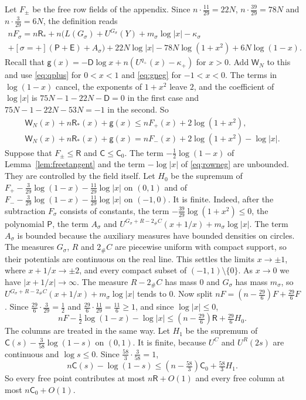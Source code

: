 \documentclass[11pt]{amsart}
\theoremstyle{definition}
\theoremstyle{remark}
\numberwithin{equation}{section}
\begin{document}
Let $F_\pm$ be the free row fields of the appendix. Since $n\cdot\frac{11}{29}=22N$, $n\cdot\frac{39}{29}=78N$ and $n\cdot\frac3{29}=6N$, the definition reads
\begin{multline*}
 nF_\sigma=n\mathsf R_*+n\bigl(L(G_\sigma)+U^{G_\sigma}(Y)+m_\sigma\log|x|-\kappa_\sigma\\
 +[\sigma=+](\mathsf P+\mathsf E)+A_\sigma\bigr)+22N\log|x|-78N\log(1+x^2)+6N\log(1-x).
\end{multline*}
Recall that $\mathsf g(x)=-\mathsf D\log x+n(U^{q_+}(x)-\kappa_+)$ for $x>0$. Add $\mathsf W_N$ to this and use \eqref{eq:qplus} for $0<x<1$ and \eqref{eq:gneg} for $-1<x<0$. The terms in $\log(1-x)$
cancel, the exponents of $1+x^2$ leave $2$, and the coefficient of $\log|x|$ is $75N-1-22N-\mathsf D=0$ in the first case and $75N-1-22N-53N=-1$ in the second. So
\begin{gather}
 \mathsf W_N(x)+n\mathsf R_*(x)+\mathsf g(x)\le nF_+(x)+2\log(1+x^2),\label{eq:rowpos}\\
 \mathsf W_N(x)+n\mathsf R_*(x)+\mathsf g(x)=nF_-(x)+2\log(1+x^2)-\log|x|.\label{eq:rowneg}
\end{gather}
Suppose that $F_\pm\le\mathsf R$ and $\mathsf C\le\mathsf C_0$.
The term $-\frac12\log(1-x)$ of Lemma~\ref{lem:freetangent} and the term $-\log|x|$ of \eqref{eq:rowneg} are unbounded. They are controlled by the field itself. Let $H_0$ be the supremum of $F_+-\frac3{29}\log(1-x)-\frac{11}{29}\log|x|$ on $(0,1)$ and of $F_--\frac3{29}\log(1-x)-\frac{11}{29}\log|x|$ on $(-1,0)$. It is finite.
Indeed, after the subtraction $F_\sigma$ consists of constants, the term $-\frac{39}{29}\log(1+x^2)\le0$, the polynomial $\mathsf P$, the term $A_\sigma$ and
$U^{G_\sigma+R-2_\#C}(x+1/x)+m_\sigma\log|x|$. The term $A_\sigma$ is bounded because the auxiliary measures have bounded densities on circles. The measures $G_\sigma$, $R$ and $2_\#C$
are piecewise uniform with compact support, so their potentials are continuous on the real line. This settles the limits $x\to\pm1$, where $x+1/x\to\pm2$, and every compact subset of
$(-1,1)\setminus\{0\}$. As $x\to0$ we have $|x+1/x|\to\infty$. The measure $R-2_\#C$ has mass $0$ and $G_\sigma$ has mass $m_\sigma$, so $U^{G_\sigma+R-2_\#C}(x+1/x)+m_\sigma\log|x|$ tends to $0$.
Now split $nF=(n-\frac{29}6)F+\frac{29}6F$. Since $\frac{29}6\cdot\frac3{29}=\frac12$ and $\frac{29}6\cdot\frac{11}{29}=\frac{11}6\ge1$, and since $\log|x|\le0$,
\[
 nF-\tfrac12\log(1-x)-\log|x|\le(n-\tfrac{29}6)\mathsf R+\tfrac{29}6H_0 .
\]
The columns are treated in the same way. Let $H_1$ be the supremum of $\mathsf C(s)-\frac3{58}\log(1-s)$ on $(0,1)$. It is finite, because $U^C$ and $U^R(2s)$ are continuous and
$\log s\le0$. Since $\frac{58}3\cdot\frac3{58}=1$,
\[
 n\mathsf C(s)-\log(1-s)\le(n-\tfrac{58}3)\mathsf C_0+\tfrac{58}3H_1 .
\]
So every free point contributes at most $n\mathsf R+O(1)$ and every free column at most $n\mathsf C_0+O(1)$. 
\end{document}
